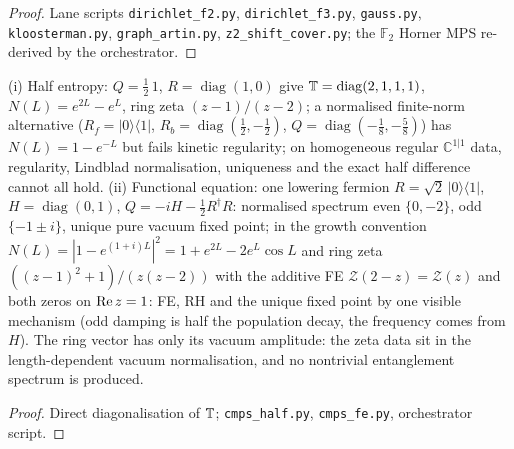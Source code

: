 \begin{proof}
Lane scripts \texttt{dirichlet\_f2.py}, \texttt{dirichlet\_f3.py}, \texttt{gauss.py}, \texttt{kloosterman.py},
\texttt{graph\_artin.py}, \texttt{z2\_shift\_cover.py}; the $\mathbb F_2$ Horner MPS re-derived by the orchestrator.
\end{proof}

\begin{proposition}
\label{prop:cmps-half-and-fe}
(i) Half entropy: $Q = \tfrac12\,1$, $R = \operatorname{diag}(1,0)$ give $\mathbb T = \operatorname{diag}(2,1,1,1)$,
$N(L) = e^{2L}-e^{L}$, ring zeta $(z-1)/(z-2)$; a normalised finite-norm alternative
($R_f = |0\rangle\langle1|$, $R_b = \operatorname{diag}(\tfrac12,-\tfrac12)$, $Q = \operatorname{diag}(-\tfrac18,-\tfrac58)$) has
$N(L) = 1-e^{-L}$ but fails kinetic regularity; on homogeneous regular $\mathbb C^{1|1}$ data,
regularity, Lindblad normalisation, uniqueness and the exact half difference cannot all hold.
(ii) Functional equation: one lowering fermion $R = \sqrt2\,|0\rangle\langle1|$, $H = \operatorname{diag}(0,1)$,
$Q = -iH-\tfrac12R^\dagger R$: normalised spectrum even $\{0,-2\}$, odd $\{-1\pm i\}$, unique pure
vacuum fixed point; in the growth convention $N(L) = |1-e^{(1+i)L}|^2 = 1+e^{2L}-2e^L\cos L$ and
ring zeta $((z-1)^2+1)/(z(z-2))$ with the additive FE $\mathcal Z(2-z) = \mathcal Z(z)$ and both zeros on
$\operatorname{Re} z = 1$: FE, RH and the unique fixed point by one visible mechanism (odd damping is half the
population decay, the frequency comes from $H$). The ring vector has only its vacuum amplitude:
the zeta data sit in the length-dependent vacuum normalisation, and no nontrivial entanglement
spectrum is produced.
\end{proposition}

\begin{proof}
Direct diagonalisation of $\mathbb T$; \texttt{cmps\_half.py}, \texttt{cmps\_fe.py}, orchestrator script.
\end{proof}

